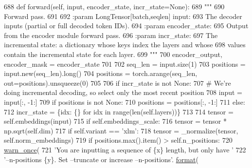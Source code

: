 \begin{DoxyCode}
688     \textcolor{keyword}{def }forward(self, input, encoder\_state, incr\_state=None):
689         \textcolor{stringliteral}{"""}
690 \textcolor{stringliteral}{        Forward pass.}
691 \textcolor{stringliteral}{}
692 \textcolor{stringliteral}{        :param LongTensor[batch,seqlen] input:}
693 \textcolor{stringliteral}{            The decoder inputs (partial or full decoded token IDs).}
694 \textcolor{stringliteral}{        :param encoder\_state:}
695 \textcolor{stringliteral}{            Output from the encoder module forward pass.}
696 \textcolor{stringliteral}{        :param incr\_state:}
697 \textcolor{stringliteral}{            The incremental state: a dictionary whose keys index the layers and whose}
698 \textcolor{stringliteral}{            values contain the incremental state for each layer.}
699 \textcolor{stringliteral}{        """}
700         encoder\_output, encoder\_mask = encoder\_state
701 
702         seq\_len = input.size(1)
703         positions = input.new(seq\_len).long()
704         positions = torch.arange(seq\_len, out=positions).unsqueeze(0)
705 
706         \textcolor{keywordflow}{if} incr\_state \textcolor{keywordflow}{is} \textcolor{keywordflow}{not} \textcolor{keywordtype}{None}:
707             \textcolor{comment}{# We're doing incremental decoding, so select only the most recent position}
708             input = input[:, -1:]
709             \textcolor{keywordflow}{if} positions \textcolor{keywordflow}{is} \textcolor{keywordflow}{not} \textcolor{keywordtype}{None}:
710                 positions = positions[:, -1:]
711         \textcolor{keywordflow}{else}:
712             incr\_state = \{idx: \{\} \textcolor{keywordflow}{for} idx \textcolor{keywordflow}{in} range(len(self.layers))\}
713 
714         tensor = self.embeddings(input)
715         \textcolor{keywordflow}{if} self.embeddings\_scale:
716             tensor = tensor * np.sqrt(self.dim)
717         \textcolor{keywordflow}{if} self.variant == \textcolor{stringliteral}{'xlm'}:
718             tensor = \_normalize(tensor, self.norm\_embeddings)
719         \textcolor{keywordflow}{if} positions.max().item() > self.n\_positions:
720             \hyperlink{namespaceparlai_1_1utils_1_1misc_a884a3aefa90581f53bc592fa6a78dc43}{warn\_once}(
721                 \textcolor{stringliteral}{'You are inputting a sequence of \{x\} length, but only have '}
722                 \textcolor{stringliteral}{'--n-positions \{y\}. Set --truncate or increase --n-positions'}.
      \hyperlink{namespaceparlai_1_1chat__service_1_1services_1_1messenger_1_1shared__utils_a32e2e2022b824fbaf80c747160b52a76}{format}(

\end{DoxyCode}
